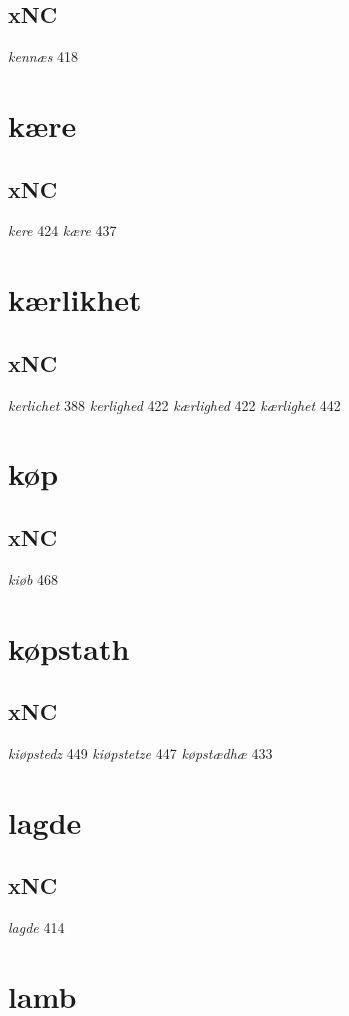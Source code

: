 \documentclass[a4paper,twocolumn]{article}
\begin{document}
\subsection{xNC}
\label{sec:org4164d5a}
\emph{kennæs} 418 
\section{kære}
\label{sec:orgb9dfdb3}
\subsection{xNC}
\label{sec:orgb41b76d}
\emph{kere} 424 \emph{kære} 437 
\section{kærlikhet}
\label{sec:org0a41a06}
\subsection{xNC}
\label{sec:orgde08c99}
\emph{kerlichet} 388 \emph{kerlighed} 422 \emph{kærlighed} 422 \emph{kærlighet} 442 
\section{køp}
\label{sec:org231cc69}
\subsection{xNC}
\label{sec:orgcc02497}
\emph{kiøb} 468 
\section{køpstath}
\label{sec:orgb1e4595}
\subsection{xNC}
\label{sec:orgc958482}
\emph{kiøpstedz} 449 \emph{kiøpstetze} 447 \emph{køpstædhæ} 433 
\section{lagde}
\label{sec:orge0e8a27}
\subsection{xNC}
\label{sec:orgfd9e222}
\emph{lagde} 414 
\section{lamb}
\label{sec:org8374039}
\end{document}
